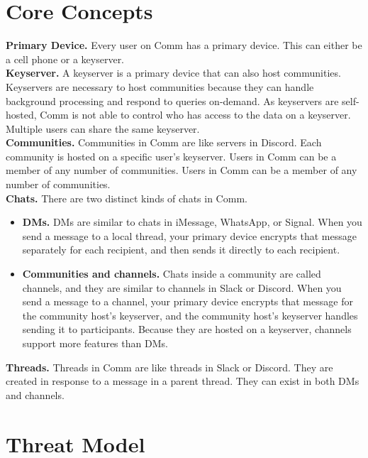 \documentclass{article}
\begin{document}
\section{Core Concepts}
\label{sec:core_concepts}

\textbf{Primary Device.} Every user on Comm has a primary device. This can either be a cell phone or a keyserver.\\

\noindent \textbf{Keyserver.} A keyserver is a primary device that can also host communities. Keyservers are necessary to host communities because they can handle background processing and respond to queries on-demand. As keyservers are self-hosted, Comm is not able to control who has access to the data on a keyserver. Multiple users can share the same keyserver.\\

\noindent \textbf{Communities.} Communities in Comm are like servers in Discord. Each community is hosted on a specific user's keyserver. Users in Comm can be a member of any number of communities. Users in Comm can be a member of any number of communities.\\

\noindent \textbf{Chats.} There are two distinct kinds of chats in Comm.
\begin{itemize}
    \item \textbf{DMs.} DMs are similar to chats in iMessage, WhatsApp, or Signal. When you send a message to a local thread, your primary device encrypts that message separately for each recipient, and then sends it directly to each recipient.
    \item \textbf{Communities and channels.} Chats inside a community are called channels, and they are similar to channels in Slack or Discord. When you send a message to a channel, your primary device encrypts that message for the community host's keyserver, and the community host's keyserver handles sending it to participants. Because they are hosted on a keyserver, channels support more features than DMs.
\end{itemize}

\noindent \textbf{Threads.} Threads in Comm are like threads in Slack or Discord. They are created in response to a message in a parent thread. They can exist in both DMs and channels.


\section{Threat Model}
\label{sec:threatmodel}
\end{document}
